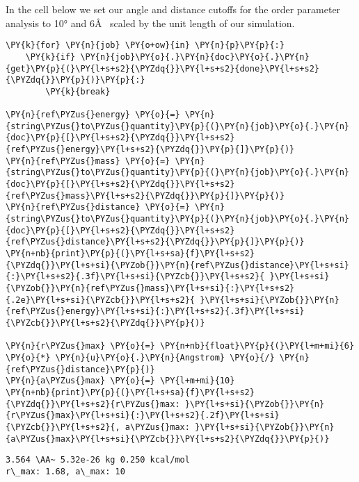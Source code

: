 In the cell below we set our angle and distance cutoffs for the order
parameter analysis to 10° and 6\AA~ scaled by the unit length of our
simulation.

    \begin{tcolorbox}[breakable, size=fbox, boxrule=1pt, pad at break*=1mm,colback=cellbackground, colframe=cellborder]
\begin{Verbatim}[commandchars=\\\{\}]
\PY{k}{for} \PY{n}{job} \PY{o+ow}{in} \PY{n}{p}\PY{p}{:}
    \PY{k}{if} \PY{n}{job}\PY{o}{.}\PY{n}{doc}\PY{o}{.}\PY{n}{get}\PY{p}{(}\PY{l+s+s2}{\PYZdq{}}\PY{l+s+s2}{done}\PY{l+s+s2}{\PYZdq{}}\PY{p}{)}\PY{p}{:}
        \PY{k}{break}
        
\PY{n}{ref\PYZus{}energy} \PY{o}{=} \PY{n}{string\PYZus{}to\PYZus{}quantity}\PY{p}{(}\PY{n}{job}\PY{o}{.}\PY{n}{doc}\PY{p}{[}\PY{l+s+s2}{\PYZdq{}}\PY{l+s+s2}{ref\PYZus{}energy}\PY{l+s+s2}{\PYZdq{}}\PY{p}{]}\PY{p}{)}
\PY{n}{ref\PYZus{}mass} \PY{o}{=} \PY{n}{string\PYZus{}to\PYZus{}quantity}\PY{p}{(}\PY{n}{job}\PY{o}{.}\PY{n}{doc}\PY{p}{[}\PY{l+s+s2}{\PYZdq{}}\PY{l+s+s2}{ref\PYZus{}mass}\PY{l+s+s2}{\PYZdq{}}\PY{p}{]}\PY{p}{)}
\PY{n}{ref\PYZus{}distance} \PY{o}{=} \PY{n}{string\PYZus{}to\PYZus{}quantity}\PY{p}{(}\PY{n}{job}\PY{o}{.}\PY{n}{doc}\PY{p}{[}\PY{l+s+s2}{\PYZdq{}}\PY{l+s+s2}{ref\PYZus{}distance}\PY{l+s+s2}{\PYZdq{}}\PY{p}{]}\PY{p}{)}
\PY{n+nb}{print}\PY{p}{(}\PY{l+s+sa}{f}\PY{l+s+s2}{\PYZdq{}}\PY{l+s+si}{\PYZob{}}\PY{n}{ref\PYZus{}distance}\PY{l+s+si}{:}\PY{l+s+s2}{.3f}\PY{l+s+si}{\PYZcb{}}\PY{l+s+s2}{ }\PY{l+s+si}{\PYZob{}}\PY{n}{ref\PYZus{}mass}\PY{l+s+si}{:}\PY{l+s+s2}{.2e}\PY{l+s+si}{\PYZcb{}}\PY{l+s+s2}{ }\PY{l+s+si}{\PYZob{}}\PY{n}{ref\PYZus{}energy}\PY{l+s+si}{:}\PY{l+s+s2}{.3f}\PY{l+s+si}{\PYZcb{}}\PY{l+s+s2}{\PYZdq{}}\PY{p}{)}

\PY{n}{r\PYZus{}max} \PY{o}{=} \PY{n+nb}{float}\PY{p}{(}\PY{l+m+mi}{6} \PY{o}{*} \PY{n}{u}\PY{o}{.}\PY{n}{Angstrom} \PY{o}{/} \PY{n}{ref\PYZus{}distance}\PY{p}{)}
\PY{n}{a\PYZus{}max} \PY{o}{=} \PY{l+m+mi}{10}
\PY{n+nb}{print}\PY{p}{(}\PY{l+s+sa}{f}\PY{l+s+s2}{\PYZdq{}}\PY{l+s+s2}{r\PYZus{}max: }\PY{l+s+si}{\PYZob{}}\PY{n}{r\PYZus{}max}\PY{l+s+si}{:}\PY{l+s+s2}{.2f}\PY{l+s+si}{\PYZcb{}}\PY{l+s+s2}{, a\PYZus{}max: }\PY{l+s+si}{\PYZob{}}\PY{n}{a\PYZus{}max}\PY{l+s+si}{\PYZcb{}}\PY{l+s+s2}{\PYZdq{}}\PY{p}{)}
\end{Verbatim}
\end{tcolorbox}

    \begin{Verbatim}[commandchars=\\\{\}]
3.564 \AA~ 5.32e-26 kg 0.250 kcal/mol
r\_max: 1.68, a\_max: 10
    \end{Verbatim}

